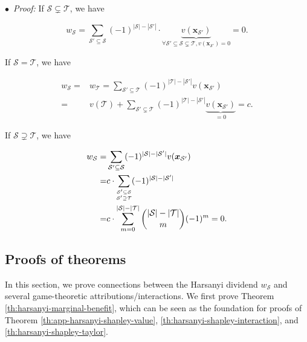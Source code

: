 $\bullet$~\textit{Proof:} If {\small$\mathcal{S}\subsetneq \mathcal{T}$}, we have


\begin{small}
\begin{equation*}
w_{\mathcal{S}}=\sum_{\mathcal{S}'\subseteq \mathcal{S}} (-1)^{|\mathcal{S}|-|\mathcal{S}'|}\cdot \underbrace{v(\boldsymbol{x}_{\mathcal{S}'})}_{\forall \mathcal{S}'\subseteq \mathcal{S}\subsetneq \mathcal{T}, v(\boldsymbol{x}_{\mathcal{S}'})=0}=0.
\end{equation*}
\end{small}

If {\small$\mathcal{S}= \mathcal{T}$}, we have


\begin{small}
\begin{align*}
w_{\mathcal{S}}=& w_{\mathcal{T}} = \sum_{\mathcal{S}'\subseteq \mathcal{T}}(-1)^{|\mathcal{T}|-|\mathcal{S}'|}v(\boldsymbol{x}_{\mathcal{S}'})\\
=& v(\mathcal{T}) + \sum_{\mathcal{S}'\subsetneq \mathcal{T}}(-1)^{|\mathcal{T}|-|\mathcal{S}'|}\underbrace{v(\boldsymbol{x}_{\mathcal{S}'})}_{=0}
=c.
\end{align*}
\end{small}

If {\small$\mathcal{S}\supsetneq \mathcal{T}$}, we have


\begin{small}
\begin{align*}
w_{\mathcal{S}}=& \sum_{\mathcal{S}'\subseteq \mathcal{S}}(-1)^{|\mathcal{S}|-|\mathcal{S}'|}v(\boldsymbol{x}_{\mathcal{S}'})\\
=& c\cdot\sum_{\scriptsize\substack{\mathcal{S}'\subseteq \mathcal{S}\\\mathcal{S}'\supseteq \mathcal{T}}} (-1)^{|\mathcal{S}|-|\mathcal{S}'|}\\
=& c\cdot\sum_{m=0}^{|\mathcal{S}|-|\mathcal{T}|}\binom{|\mathcal{S}|-|\mathcal{T}|}{m} (-1)^m = 0.
\end{align*}
\end{small}

\subsection{Proofs of theorems}
\label{sec:app-interaction-theorems}

In this section, we prove connections between the Harsanyi dividend {\small$w_{\mathcal{S}}$} and several game-theoretic attributions/interactions.
We first prove Theorem \ref{th:harsanyi-marginal-benefit}, which can be seen as the foundation for proofs of Theorem \ref{th:app-harsanyi-shapley-value}, \ref{th:harsanyi-shapley-interaction}, and \ref{th:harsanyi-shapley-taylor}. 



